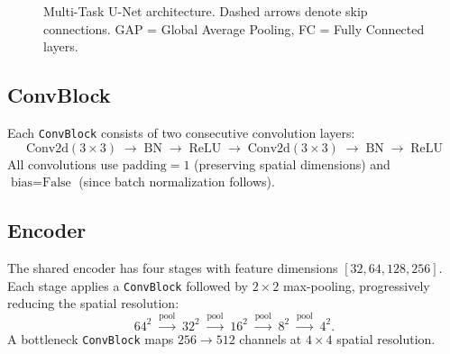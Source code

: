 \documentclass[11pt,a4paper]{article}
\begin{document}
\begin{figure}[H]
\caption{Multi-Task U-Net architecture. Dashed arrows denote skip connections.
         GAP = Global Average Pooling, FC = Fully Connected layers.}
\label{fig:unet-arch}
\end{figure}

\subsection{ConvBlock}

Each \texttt{ConvBlock} consists of two consecutive convolution layers:
\[
    \text{Conv2d}(3{\times}3) \;\to\; \text{BN} \;\to\; \text{ReLU}
    \;\to\; \text{Conv2d}(3{\times}3) \;\to\; \text{BN} \;\to\; \text{ReLU}
\]
All convolutions use $\text{padding} = 1$ (preserving spatial dimensions) and
$\text{bias} = \text{False}$ (since batch normalization follows).

\subsection{Encoder}

The shared encoder has four stages with feature dimensions
$[32, 64, 128, 256]$. Each stage applies a \texttt{ConvBlock} followed by
$2 \times 2$ max-pooling, progressively reducing the spatial resolution:
\[
    64^2 \;\xrightarrow{\text{pool}}\; 32^2 \;\xrightarrow{\text{pool}}\;
    16^2 \;\xrightarrow{\text{pool}}\; 8^2 \;\xrightarrow{\text{pool}}\; 4^2.
\]
A bottleneck \texttt{ConvBlock} maps $256 \to 512$ channels at $4 \times 4$
spatial resolution.
\end{document}
